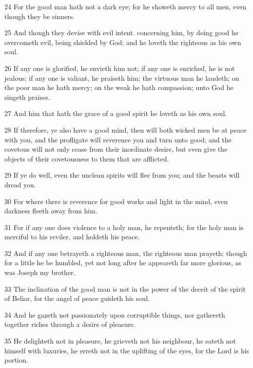 \par 24 For the good man hath not a dark eye; for he showeth mercy to all men, even though they be sinners.

\par 25 And though they devise with evil intent. concerning him, by doing good he overcometh evil, being shielded by God; and he loveth the righteous as his own soul.

\par 26 If any one is glorified, he envieth him not; if any one is enriched, he is not jealous; if any one is valiant, he praiseth him; the virtuous man he laudeth; on the poor man he hath mercy; on the weak he hath compassion; unto God he singeth praises.

\par 27 And him that hath the grace of a good spirit he loveth as his own soul.

\par 28 If therefore, ye also have a good mind, then will both wicked men be at peace with you, and the profligate will reverence you and turn unto good; and the covetous will not only cease from their inordinate desire, but even give the objects of their covetousness to them that are afflicted.

\par 29 If ye do well, even the unclean spirits will flee from you; and the beasts will dread you.

\par 30 For where there is reverence for good works and light in the mind, even darkness fleeth away from him.

\par 31 For if any one does violence to a holy man, he repenteth; for the holy man is merciful to his reviler, and holdeth his peace.

\par 32 And if any one betrayeth a righteous man, the righteous man prayeth: though for a little he be humbled, yet not long after he appeareth far more glorious, as was Joseph my brother.

\par 33 The inclination of the good man is not in the power of the deceit of the spirit of Beliar, for the angel of peace guideth his soul.

\par 34 And he gazeth not passionately upon corruptible things, nor gathereth together riches through a desire of pleasure.

\par 35 He delighteth not in pleasure, he grieveth not his neighbour, he sateth not himself with luxuries, he erreth not in the uplifting of the eyes, for the Lord is his portion.

